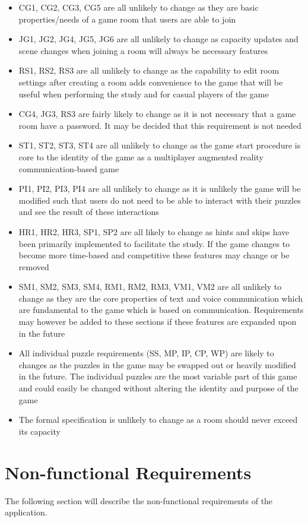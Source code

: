 \documentclass[12pt]{article}
\begin{document}
\begin{itemize}
    \item CG1, CG2, CG3, CG5 are all unlikely to change as they are basic properties/needs of a game room that users are able to join
    \item JG1, JG2, JG4, JG5, JG6 are all unlikely to change as capacity updates and scene changes when joining a room will always be necessary features
    \item RS1, RS2, RS3 are all unlikely to change as the capability to edit room settings after creating a room adds convenience to the game that will be useful when performing the study and for casual players of the game
    \item CG4, JG3, RS3 are fairly likely to change as it is not necessary that a game room have a password. It may be decided that this requirement is not needed
    \item ST1, ST2, ST3, ST4 are all unlikely to change as the game start procedure is core to the identity of the game as a multiplayer augmented reality communication-based game
    \item PI1, PI2, PI3, PI4 are all unlikely to change as it is unlikely the game will be modified such that users do not need to be able to interact with their puzzles and see the result of these interactions
    \item HR1, HR2, HR3, SP1, SP2 are all likely to change as hints and skips have been primarily implemented to facilitate the study. If the game changes to become more time-based and competitive these features may change or be removed
    \item SM1, SM2, SM3, SM4, RM1, RM2, RM3, VM1, VM2 are all unlikely to change as they are the core properties of text and voice communication which are fundamental to the game which is based on communication. Requirements may however be added to these sections if these features are expanded upon in the future
    \item All individual puzzle requirements (SS, MP, IP, CP, WP) are likely to changes as the puzzles in the game may be swapped out or heavily modified in the future. The individual puzzles are the most variable part of this game and could easily be changed without altering the identity and purpose of the game
    \item The formal specification is unlikely to change as a room should never exceed its capacity
\end{itemize}

\section{Non-functional Requirements}
The following section will describe the non-functional requirements of the application.
\end{document}
